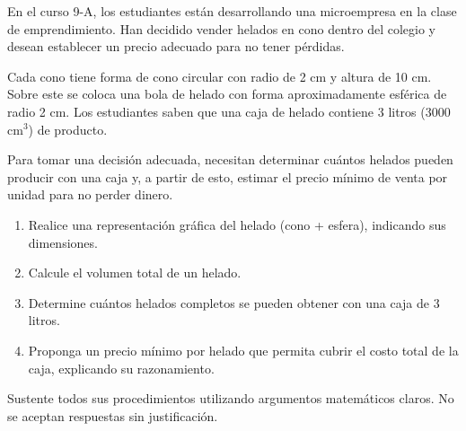 En el curso 9-A, los estudiantes están desarrollando una microempresa en la clase de emprendimiento. Han decidido vender helados en cono dentro del colegio y desean establecer un precio adecuado para no tener pérdidas.

Cada cono tiene forma de cono circular con radio de 2 cm y altura de 10 cm. Sobre este se coloca una bola de helado con forma aproximadamente esférica de radio 2 cm. Los estudiantes saben que una caja de helado contiene 3 litros (3000 cm$^3$) de producto.

Para tomar una decisión adecuada, necesitan determinar cuántos helados pueden producir con una caja y, a partir de esto, estimar el precio mínimo de venta por unidad para no perder dinero.

\begin{enumerate}
\item Realice una representación gráfica del helado (cono + esfera), indicando sus dimensiones.
\item Calcule el volumen total de un helado.
\item Determine cuántos helados completos se pueden obtener con una caja de 3 litros.
\item Proponga un precio mínimo por helado que permita cubrir el costo total de la caja, explicando su razonamiento.
\end{enumerate}

Sustente todos sus procedimientos utilizando argumentos matemáticos claros. No se aceptan respuestas sin justificación.